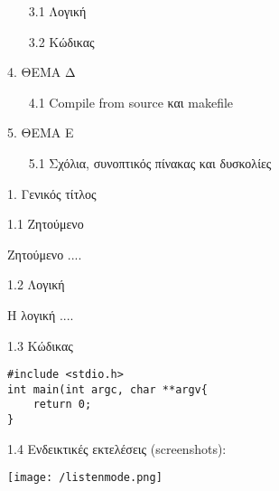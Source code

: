 \documentclass{article}
\begin{document}
\makeatother
\Large{
\begin{enumerate}[align=parleft]
  \item[3.1] Λογική  
  \item[3.2] Κώδικας 
\end{enumerate}
}
%
\par
\vspace{1cm}
\huge{ 4. ΘΕΜΑ Δ}
\makeatletter
\makeatother
\Large{
\begin{enumerate}[align=parleft]
  \item[4.1] Compile from source και makefile 
\end{enumerate}
}
\par
\vspace{1cm}
%
\huge{5. ΘΕΜΑ Ε}
\makeatletter

\makeatother
\Large{
\begin{enumerate}[align=parleft]
  \item[5.1] Σχόλια, συνοπτικός πίνακας και δυσκολίες 
\end{enumerate}
}




\newpage

\Huge{1. Γενικός τίτλος}
\par
\vspace{0.5cm}
\huge{1.1 Ζητούμενο}
\par
\vspace{0.4cm}
\large{Ζητούμενο ....}

\vspace{0.4cm}

\huge{1.2 Λογική }

\vspace{0.4cm}

\large{Η λογική .... }
\par
\vspace{0.5cm}
\huge{1.3 Κώδικας }

\begin{verbatim}
#include <stdio.h>
int main(int argc, char **argv{
    return 0;
}
\end{verbatim}

\huge{1.4 Ενδεικτικές εκτελέσεις (screenshots):}

\begin{center}
\texttt{[image: /listenmode.png]}
\end{center}
\end{document}
